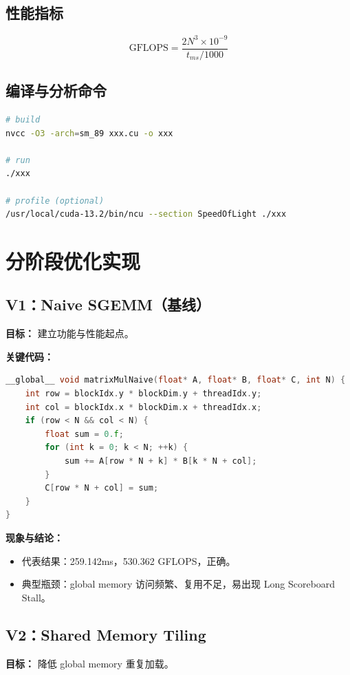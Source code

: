 \documentclass[12pt,a4paper]{ctexart}
\begin{document}
\subsection{性能指标}
\[
\mathrm{GFLOPS} = \frac{2N^3 \times 10^{-9}}{t_{ms}/1000}
\]

\subsection{编译与分析命令}
\begin{lstlisting}[language=bash]
# build
nvcc -O3 -arch=sm_89 xxx.cu -o xxx

# run
./xxx

# profile (optional)
/usr/local/cuda-13.2/bin/ncu --section SpeedOfLight ./xxx
\end{lstlisting}

\section{分阶段优化实现}

\subsection{V1：Naive SGEMM（基线）}
\textbf{目标：} 建立功能与性能起点。

\textbf{关键代码：}
\begin{lstlisting}[language=C++]
__global__ void matrixMulNaive(float* A, float* B, float* C, int N) {
    int row = blockIdx.y * blockDim.y + threadIdx.y;
    int col = blockIdx.x * blockDim.x + threadIdx.x;
    if (row < N && col < N) {
        float sum = 0.f;
        for (int k = 0; k < N; ++k) {
            sum += A[row * N + k] * B[k * N + col];
        }
        C[row * N + col] = sum;
    }
}
\end{lstlisting}

\textbf{现象与结论：}
\begin{itemize}[leftmargin=2em]
  \item 代表结果：259.142ms，530.362 GFLOPS，正确。
  \item 典型瓶颈：global memory 访问频繁、复用不足，易出现 Long Scoreboard Stall。
\end{itemize}

\subsection{V2：Shared Memory Tiling}
\textbf{目标：} 降低 global memory 重复加载。
\end{document}
